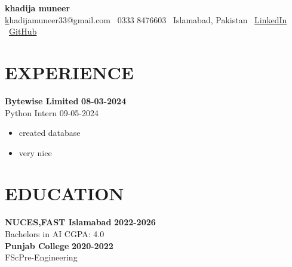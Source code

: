 \documentclass[a4paper,10pt]{article}
\begin{document}
\noindent %
{\Large \textbf{ khadija muneer }} \\
\small
\href{mailto:khadijamuneer33@gmail.com}khadijamuneer33@gmail.com \textbar \
0333 8476603 \textbar \
Islamabad, Pakistan \textbar \
\href{https://https://mail.google.com/mail/u/0/?tab=rm\&ogbl#inbox/FMfcgzQcqHbhMRshwxzkklDWvQMBgNvf}{LinkedIn} \textbar \
\href{https://https://github.com/}{GitHub}
\vspace{0.2em}

\section*{EXPERIENCE}

\textbf{ Bytewise Limited } \hfill \textbf{ 08-03-2024 } \\
Python Intern \hfill 09-05-2024\\[-0.3em]
\begin{itemize}[leftmargin=1em, noitemsep, topsep=0pt, partopsep=0pt, parsep=0pt]

    \item created database

    \item very nice

\end{itemize}\vspace{0.3em} %


\section*{EDUCATION}

\textbf{ NUCES,FAST Islamabad } \hfill \textbf{ 2022-2026 } \\
Bachelors in AI \hfill CGPA: 4.0\\[0.3em] %

\textbf{ Punjab College } \hfill \textbf{ 2020-2022 } \\
FScPre-Engineering\\[0.3em] %
\end{document}
